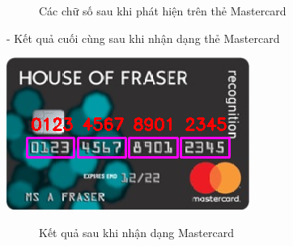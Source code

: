 \begin{figure}[htp!]
    \caption{Các chữ số sau khi phát hiện trên thẻ Mastercard}
\end{figure}

- Kết quả cuối cùng sau khi nhận dạng thẻ Mastercard
\begin{center}
    \includegraphics[]{images/mastercard/Ket_qua_mastercard.png}
\end{center}

\begin{figure}[htp!]
    \caption{Kết quả sau khi nhận dạng Mastercard}
\end{figure}